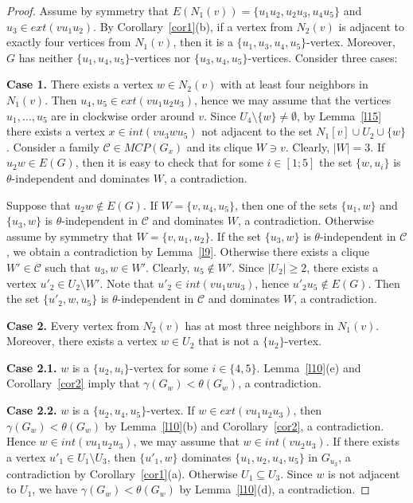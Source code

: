 \documentclass[12pt]{article}
\begin{document}
\begin{proof}

Assume by symmetry that $E(N_1(v)) = \{u_1u_2,u_2u_3,u_4u_5\}$ and $u_3 \in ext(vu_1u_2)$. By Corollary~\ref{cor1}(b), if a vertex from $N_2(v)$ is adjacent to exactly four vertices from $N_1(v)$, then it is a $\{u_1,u_3,u_4,u_5\}$-vertex. Moreover, $G$ has neither $\{u_1,u_4,u_5\}$-vertices nor $\{u_3,u_4,u_5\}$-vertices. Consider three cases:

\textbf{Case 1.} There exists a vertex $w \in N_2(v)$ with at least four neighbors in $N_1(v)$. Then $u_4,u_5 \in ext(vu_1u_2u_3)$, hence we may assume that the vertices $u_1,\ldots, u_5$ are in clockwise order around $v$. Since $U_4 \setminus \{w\} \neq \emptyset$, by Lemma~\ref{l15} there exists a vertex $x \in int(vu_3wu_5)$ not adjacent to the set $N_1[v] \cup U_2 \cup \{w\}$. Consider a family $\mathcal{C} \in MCP(G_x)$ and its clique $W \ni v$. Clearly, $|W| = 3$. If $u_2w \in E(G)$, then it is easy to check that for some $i \in [1;5]$ the set $\{w,u_i\}$ is $\theta$-independent and dominates $W$, a contradiction. 

Suppose that $u_2w \notin E(G)$. If $W = \{v,u_4,u_5\}$, then one of the sets $\{u_1,w\}$ and $\{u_3,w\}$ is $\theta$-independent in $\mathcal{C}$ and dominates $W$, a contradiction. Otherwise assume by symmetry that $W = \{v,u_1,u_2\}$. If the set $\{u_3,w\}$ is $\theta$-independent in $\mathcal{C}$, we obtain a contradiction by Lemma~\ref{l9}. Otherwise there exists a clique $W' \in \mathcal{C}$ such that $u_3,w \in W'$. Clearly, $u_5 \notin W'$. Since $|U_2| \geq 2$, there exists a vertex $u'_2 \in U_2 \setminus W'$. Note that $u'_2 \in int(vu_1wu_3)$, hence $u'_2u_5 \notin E(G)$. Then the set $\{u'_2,w,u_5\}$ is $\theta$-independent in $\mathcal{C}$ and dominates $W$, a contradiction.

\textbf{Case 2.} Every vertex from $N_2(v)$ has at most three neighbors in $N_1(v)$. Moreover, there exists a vertex $w \in U_2$ that is not a $\{u_2\}$-vertex.

\textbf{Case 2.1.} $w$ is a $\{u_2,u_i\}$-vertex for some $i \in \{4,5\}$. Lemma~\ref{l10}(e) and Corollary~\ref{cor2} imply that $\gamma(G_w) < \theta(G_w)$, a contradiction.

\textbf{Case 2.2.}  $w$ is a $\{u_2,u_4,u_5\}$-vertex. If $w \in ext(vu_1u_2u_3)$, then $\gamma(G_w) < \theta(G_w)$ by Lemma~\ref{l10}(b) and Corollary~\ref{cor2}, a contradiction. Hence $w \in int(vu_1u_2u_3)$, we may assume that $w \in int(vu_2u_3)$. If there exists a vertex $u'_1 \in U_1 \setminus U_3$, then $\{u'_1,w\}$ dominates $\{u_1,u_2,u_4,u_5\}$ in $G_{u_3}$, a contradiction by Corollary~\ref{cor1}(a). Otherwise $U_1 \subseteq U_3$. Since $w$ is not adjacent to $U_1$, we have $\gamma(G_w) < \theta(G_w)$ by Lemma~\ref{l10}(d), a contradiction.


\end{proof}
\end{document}

